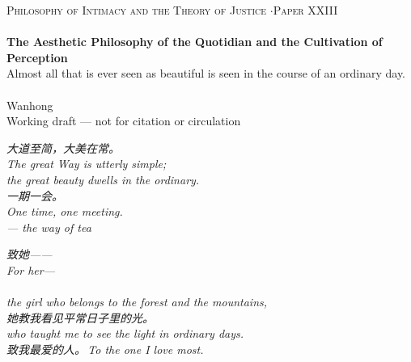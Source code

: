 \documentclass[11pt,a4paper]{article}
\begin{document}
\thispagestyle{empty}
\begin{center}
\vspace*{2cm}
{\footnotesize\color{rosedeep}\scshape Philosophy of Intimacy and the Theory of Justice \quad$\cdot$\quad Paper XXIII}\\[0.3cm]
\coverrule\\[1.2cm]
{\LARGE\bfseries\color{warnred} The Aesthetic Philosophy of the Quotidian and the Cultivation of Perception}\\[1.0cm]
{\normalsize\color{inksoft} Almost all that is ever seen as beautiful is seen in the course of an ordinary day.}\\[2cm]
\coverrule[0.25]\\[0.6cm]
{\normalsize\color{inksoft} Wanhong}\\
\vfill
{\footnotesize\color{gold} Working draft --- not for citation or circulation}
\coverfootnote
\end{center}
\newpage

\thispagestyle{empty}
\vspace*{2.2cm}
\begin{center}
\begin{minipage}{0.76\linewidth}
\centering\itshape\color{rose}
{\cjk 大道至简，大美在常。}\\[0.3em]
The great Way is utterly simple;\\[0.15em]
the great beauty dwells in the ordinary.\\[1.4em]
\upshape\itshape
{\cjk 一期一会。}\\[0.3em]
One time, one meeting.\\[0.6em]
{\upshape\footnotesize\color{gold} --- the way of tea}
\end{minipage}
\end{center}
\newpage

\thispagestyle{empty}
\vspace*{4.5cm}
\begin{center}
\begin{minipage}{0.74\linewidth}
\centering\itshape\color{rose}
{\cjk 致她——}\\[0.3em]
For her---\\[0.7em]
\\[0.2em]
the girl who belongs to the forest and the mountains,\\[0.5em]
{\cjk 她教我看见平常日子里的光。}\\[0.2em]
who taught me to see the light in ordinary days.\\[1.0em]
{\upshape\footnotesize\color{gold} {\cjk 致我最爱的人。}\,\;To the one I love most.}
\end{minipage}
\end{center}
\newpage
\end{document}
